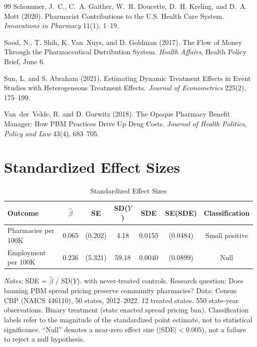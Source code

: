 \documentclass[12pt]{article}
\begin{document}
\begin{thebibliography}{99}
Schommer, J.~C., C.~A. Gaither, W.~R. Doucette, D.~H. Kreling, and D.~A. Mott (2020).
\newblock Pharmacist Contributions to the {U.S.} Health Care System.
\newblock \emph{Innovations in Pharmacy} 11(1), 1--19.

Sood, N., T. Shih, K. Van~Nuys, and D. Goldman (2017).
\newblock The Flow of Money Through the Pharmaceutical Distribution System.
\newblock \emph{Health Affairs}, Health Policy Brief, June 6.

Sun, L. and S. Abraham (2021).
\newblock Estimating Dynamic Treatment Effects in Event Studies with Heterogeneous Treatment Effects.
\newblock \emph{Journal of Econometrics} 225(2), 175--199.

Van~der~Velde, R. and D. Gurwitz (2018).
\newblock The Opaque Pharmacy Benefit Manager: How PBM Practices Drive Up Drug Costs.
\newblock \emph{Journal of Health Politics, Policy and Law} 43(4), 683--705.

\end{thebibliography}

\newpage
\appendix

\section{Standardized Effect Sizes}
\label{sec:sde}

\begin{table}[htbp]
\centering
\caption{Standardized Effect Sizes}
\label{tab:sde}
\begin{threeparttable}
\begin{tabular}{lcccccc}
\toprule
Outcome & $\hat{\beta}$ & SE & SD($Y$) & SDE & SE(SDE) & Classification \\
\midrule
Pharmacies per 100K & 0.065 & (0.202) & 4.18 & 0.0155 & (0.0484) & Small positive \\
Employment per 100K & 0.236 & (5.321) & 59.18 & 0.0040 & (0.0899) & Null \\
\bottomrule
\end{tabular}
\begin{tablenotes}[flushleft]\small
\item \textit{Notes:} SDE = $\hat{\beta}$ / SD($Y$). \citet{callaway2021difference} with never-treated controls. Research question: Does banning PBM spread pricing preserve community pharmacies? Data: Census CBP (NAICS 446110), 50 states, 2012--2022. 12 treated states. 550 state-year observations. Binary treatment (state enacted spread pricing ban). Classification labels refer to the magnitude of the standardized point estimate, not to statistical significance. ``Null'' denotes a near-zero effect size ($|$SDE$| < 0.005$), not a failure to reject a null hypothesis.
\end{tablenotes}
\end{threeparttable}
\end{table}
\end{document}
